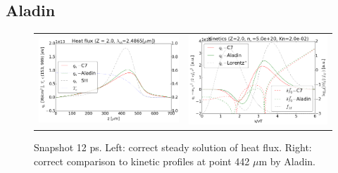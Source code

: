 \subsection{Aladin}
\label{sec:Aladincode}

\begin{figure}[tbh]
  \begin{center}
    \begin{tabular}{cc}
      \includegraphics[width=\figscale\textwidth]{../VFPdata/C7_Aladin_case1_heatflux.png} &
      \includegraphics[width=\figscale\textwidth]{../VFPdata/C7_Aladin_case1_kinetics.png}
    \end{tabular}
  \caption{  
  Snapshot 12 ps. Left: correct steady solution of heat flux. Right: correct comparison to kinetic profiles at point 442 $\mu$m by Aladin.}
  \end{center}
  \label{fig:C7_Aladin_case1}
\end{figure}

